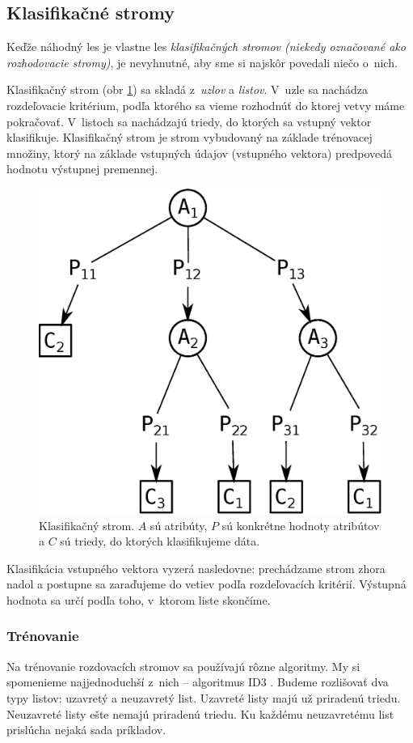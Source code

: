 \subsection{Klasifikačné stromy}
Keďže náhodný les je vlastne les \textit{klasifikačných stromov (niekedy označované ako rozhodovacie stromy)}, je nevyhnutné, aby sme si najskôr povedali niečo o~nich.

Klasifikačný strom (obr \ref{fig:clf-tree}) sa skladá z~\textit{uzlov} a \textit{listov}. V~uzle sa nachádza rozdeľovacie kritérium, podľa ktorého sa vieme rozhodnúť do ktorej vetvy máme pokračovať. V~listoch sa nachádzajú triedy, do ktorých sa vstupný vektor klasifikuje. Klasifikačný strom je strom vybudovaný na základe trénovacej množiny, ktorý na základe vstupných údajov (vstupného vektora) predpovedá hodnotu výstupnej premennej.

\begin{figure}[htp]
    \centering
    \includegraphics[width=.5\textwidth]{images/decision_tree}
    \caption[Klasifikačný strom]{Klasifikačný strom. $A$ sú atribúty, $P$ sú konkrétne hodnoty atribútov a $C$ sú triedy, do ktorých klasifikujeme dáta.}
    \label{fig:clf-tree}
\end{figure}

Klasifikácia vstupného vektora vyzerá nasledovne: prechádzame strom zhora nadol a postupne sa zaraďujeme do vetiev podľa rozdeľovacích kritérií. Výstupná hodnota sa určí podľa toho, v~ktorom liste skončíme.

\subsubsection{Trénovanie}

Na trénovanie rozdovacích stromov sa používajú rôzne algoritmy. My si spomenieme najjednoduchší z~nich -- algoritmus ID3 \cite{wiki:id3}. Budeme rozlišovať dva typy listov: uzavretý a neuzavretý list. Uzavreté listy majú už priradenú triedu. Neuzavreté listy ešte nemajú priradenú triedu. Ku každému neuzavretému list prislúcha nejaká sada príkladov.


